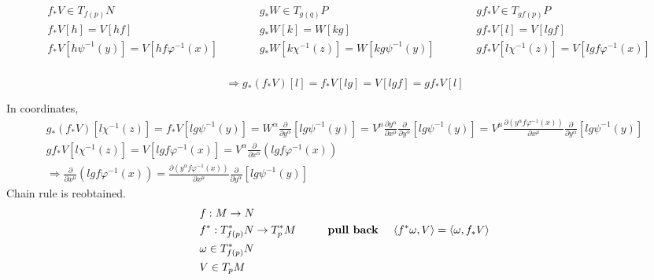 \documentclass{book}
\begin{document}
\[
\begin{gathered}
\begin{aligned}
  & f_*V \in T_{f(p)}N \\ 
  & f_*V[h] = V[hf] \\ 
  & f_*V[h\psi^{-1}(y)] = V[hf\varphi^{-1}(x)]
\end{aligned} \quad \quad \, \begin{aligned}
  & g_*W \in T_{g(q)}P \\ 
  & g_*W[k] = W[kg] \\ 
  & g_*W[k\chi^{-1}(z)] = W[kg\psi^{-1}(y)]
\end{aligned}  \quad \quad \, \begin{aligned}
  & gf_*V \in T_{gf(p)}P \\ 
  & gf_*V[l] = V[lgf] \\ 
  & gf_*V[l\chi^{-1}(z)] = V[lgf\varphi^{-1}(x)]
\end{aligned} \\
\end{gathered}
\]

\[
\Longrightarrow g_*(f_*V)[l] = f_* V[lg] = V[lgf] = gf_*V[l]
\]

In coordinates, 
\[
\begin{gathered}
  g_*(f_*V)[l\chi^{-1}(z) ] = f_*V[lg\psi^{-1}(y)] = W^{\alpha} \frac{ \partial }{ \partial y^{\alpha}}[ lg\psi^{-1}(y)] = V^{\mu} \frac{ \partial y^{\alpha} }{ \partial x^{\mu} } \frac{ \partial }{ \partial y^{\alpha} } [lg\psi^{-1}(y)] = V^{\mu} \frac{ \partial (y^{\alpha}f\varphi^{-1}(x)) }{ \partial x^{\mu} } \frac{ \partial }{ \partial y^{\alpha} } [lg\psi^{-1}(y) ] \\
  gf_*V[l \chi^{-1}(z) ] = V[lgf\varphi^{-1}(x) ] = V^{\alpha} \frac{ \partial }{ \partial x^{\alpha} }( lgf\varphi^{-1}(x)) \\
  \Longrightarrow  \frac{ \partial }{ \partial x^{\mu} }( lgf\varphi^{-1}(x)) = \frac{ \partial (y^{\alpha}f\varphi^{-1}(x)) }{ \partial x^{\mu} } \frac{ \partial }{ \partial y^{\alpha} } [lg\psi^{-1}(y) ]
\end{gathered}
\]
Chain rule is reobtained. \\

\[
\begin{aligned}
  & f: M \to N \\ 
  & f^* : T^*_{f(p)}N \to T^*_p M \quad \quad \, \text{ \textbf{ pull back }}
  & \langle f^* \omega, V \rangle = \langle \omega, f_* V \rangle \\
  & \begin{aligned}
      & \omega \in T^*_{f(p)}N \\ 
      & V \in T_p M \end{aligned}
\end{aligned}
\]
\end{document}
